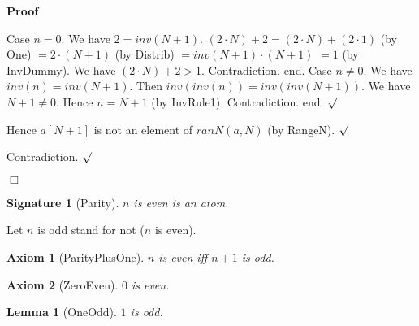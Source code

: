 \documentclass{article}
\newenvironment{forthel}{\begin{leftbar}}{\end{leftbar}}
\newenvironment{proof}{\noindent\textbf{Proof\ }}{\hspace*{\fill}$\Box$\medskip}
\newenvironment{subproof}{\begin{list}{}{}
		\item[\text{Proof}]}{\hfill $\surd$ \end{list}}
\newtheorem{axiom}{Axiom}
\newtheorem{lemma}{Lemma}
\newtheorem{signature}{Signature}
\newcommand{\dotequal}{=}
\begin{document}
\begin{forthel}
\begin{proof}
\begin{subproof}
\begin{subproof}
\begin{subproof}
	Case $n = 0$.
	We have $2 = inv(N + 1)$.
	$(2 \cdot N) + 2 \dotequal (2 \cdot N) + (2 \cdot 1)$ (by One)
	$\dotequal 2 \cdot (N + 1)$ (by Distrib)
	$\dotequal inv(N + 1) \cdot (N + 1)$
	$\dotequal 1$ (by InvDummy).
	We have $(2 \cdot N) + 2 > 1$.
	Contradiction.
	end.
	Case $n \neq 0$.
	We have $inv(n) = inv(N + 1)$.
	Then $inv(inv(n)) = inv(inv(N + 1))$.
	We have $N + 1 \neq 0$.
	Hence $n = N + 1$ (by InvRule1).
	Contradiction.
	end.
	\end{subproof}
	Hence $a[N + 1]$ is not an element of $ranN(a,N)$ (by RangeN).
	\end{subproof}
	Contradiction.
	\end{subproof}
	\end{proof}
	
	\begin{signature}[Parity]
	$n$ is even is an atom.
	\end{signature}
	
	\noindent Let $n$ is odd stand for not ($n$ is even).
	
	\begin{axiom}[ParityPlusOne]
	$n$ is even iff $n + 1$ is odd.
	\end{axiom}

	\begin{axiom}[ZeroEven]
	$0$ is even.
	\end{axiom}
	
	\begin{lemma}[OneOdd]
	$1$ is odd.
	\end{lemma} 
	

\end{forthel}
\end{document}
